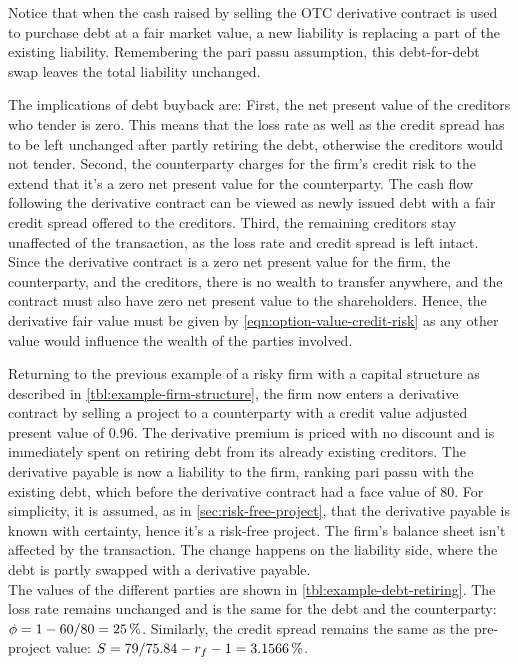 \documentclass[main.tex]{subfiles}
\begin{document}
            Notice that when the cash raised by selling the OTC derivative contract 
            is used to purchase debt at a fair market value, a new liability is replacing a part of the existing liability. 
            Remembering the pari passu assumption, this debt-for-debt swap leaves the total liability unchanged.

            The implications of debt buyback are: 
            First, the net present value of the creditors who tender is zero. 
            This means that the loss rate as well as the credit spread has to be left unchanged
            after partly retiring the debt, otherwise the creditors would not tender. 
            Second, the counterparty charges for the firm's credit risk 
            to the extend that it's a zero net present value for the counterparty. 
            The cash flow following the derivative contract can be viewed as newly issued debt
            with a fair credit spread offered to the creditors.
            Third, the remaining creditors stay unaffected of the transaction, 
            as the loss rate and credit spread is left intact. 
            Since the derivative contract is a zero net present value for the firm, 
            the counterparty, and the creditors, there is no wealth to transfer anywhere,
            and the contract must also have zero net present value to the shareholders. 
            Hence, the derivative fair value must be given by \cref{eqn:option-value-credit-risk} 
            as any other value would influence the wealth of the parties involved.

            Returning to the previous example of a risky firm with a capital structure
            as described in \cref{tbl:example-firm-structure}, 
            the firm now enters a derivative contract by selling a project to a counterparty
            with a credit value adjusted present value of \num{0.96}. 
            The derivative premium is priced with no discount 
            and is immediately spent on retiring debt from its already existing creditors. 
            The derivative payable is now a liability to the firm, ranking pari passu with the existing debt, 
            which before the derivative contract had a face value of 80. 
            For simplicity, it is assumed, as in \cref{sec:risk-free-project},
            that the derivative payable is known with certainty, hence it's a risk-free project. 
            The firm's balance sheet isn't affected by the transaction. 
            The change happens on the liability side, where the debt is partly swapped with a derivative payable.\\
            The values of the different parties are shown in \cref{tbl:example-debt-retiring}. 
            The loss rate remains unchanged and is the same for the debt and the counterparty: $\phi=1-\num{60}/\num{80}=\pct{0.25}$. 
            Similarly, the credit spread remains the same as the pre-project value: $S=\num{79}/\num{75.84}-r_{f}-1=\pct{0.031566}$.
            
\end{document}
